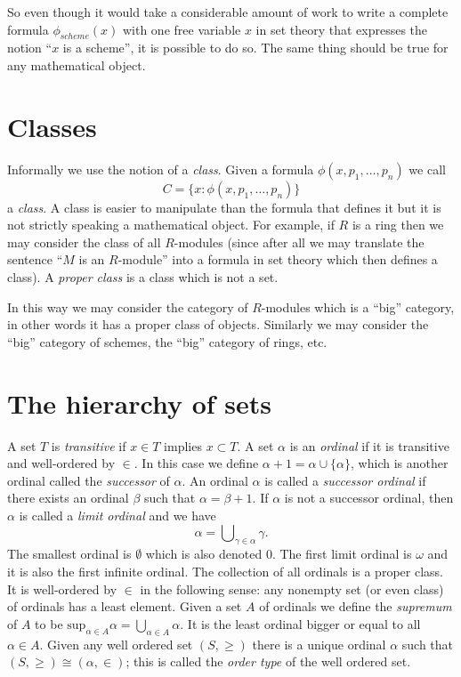 \medskip\noindent
So even though it would take a considerable amount of work to write
a complete formula $\phi_{scheme}(x)$ with one free variable $x$ in set theory 
that expresses the notion ``$x$ is a scheme'', it is possible to do so.
The same thing should be true for any mathematical object.

\section{Classes}
\label{section-classes}

\noindent
Informally we use the notion of a {\it class}. Given a formula
$\phi(x,p_1,\ldots,p_n)$ we call
$$
C = \{x : \phi(x,p_1,\ldots,p_n)\}
$$
a {\it class}. A class is easier to manipulate than the formula
that defines it but it is not strictly speaking a mathematical
object. For example, if $R$ is a ring then we may
consider the class of all $R$-modules (since after all we
may translate the sentence ``$M$ is an $R$-module''
into a formula in set theory which then defines a class).
A {\it proper class} is a class which is not a set.

\medskip\noindent
In this way we may consider the category of $R$-modules
which is a ``big'' category, in other words it has a
proper class of objects. Similarly we may consider
the ``big'' category of schemes, the ``big'' category
of rings, etc.

\section{The hierarchy of sets}
\label{section-sets-hierarchy}

\noindent
A set $T$ is {\it transitive} if $x\in T$ implies $x\subset T$.
A set $\alpha$ is an {\it ordinal} if it is transitive and well-ordered
by $\in$. In this case we define $\alpha + 1 = \alpha \cup \{\alpha\}$,
which is another ordinal called the {\it successor} of $\alpha$.
An ordinal $\alpha$ is called a {\it successor ordinal} if 
there exists an ordinal $\beta$ such that $\alpha = \beta + 1$.
If $\alpha$ is not a successor ordinal, then $\alpha$ is called
a {\it limit ordinal} and we have
$$
\alpha 
=
\bigcup\nolimits_{\gamma \in \alpha} \gamma.
$$
The smallest ordinal is $\emptyset$ which is also denoted $0$.
The first limit ordinal is $\omega$ and it is also the first
infinite ordinal. The collection of all ordinals is a proper class.
It is well-ordered by $\in$ in the following sense: any nonempty set
(or even class) of ordinals has a least element.
Given a set $A$ of ordinals we define the {\it supremum}
of $A$ to be $\text{sup}_{\alpha \in A} \alpha = 
\bigcup_{\alpha \in A} \alpha$. It is the least ordinal bigger
or equal to all $\alpha \in A$.
Given any well ordered set $(S, \geq)$ there is a unique ordinal
$\alpha$ such that $(S, \geq) \cong (\alpha, \in)$; this is
called the {\it order type} of the well ordered set.

